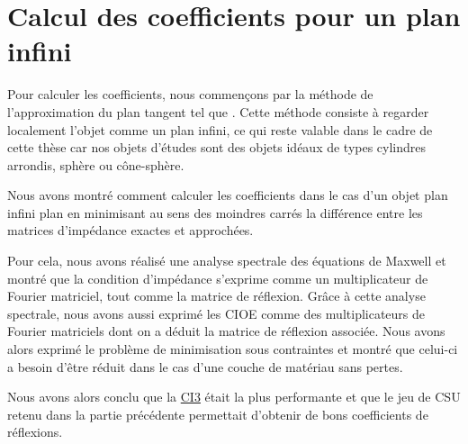 \chapter{Calcul des coefficients pour un plan infini}
\label{sec:plan}
\minitoc
\newpage
{}
Pour calculer les coefficients, nous commençons par la méthode de l'approximation du plan tangent tel que \cite{hoppe_impedance_1995}. Cette méthode consiste à regarder localement l'objet comme un plan infini, ce qui reste valable dans le cadre de cette thèse car nos objets d'études sont des objets idéaux de types cylindres arrondis, sphère ou cône-sphère.






Nous avons montré comment calculer les coefficients dans le cas d'un objet plan infini plan en minimisant au sens des moindres carrés la différence entre les matrices d'impédance exactes et approchées. 

Pour cela, nous avons réalisé une analyse spectrale des équations de Maxwell et montré que la condition d'impédance s'exprime comme un multiplicateur de Fourier matriciel, tout comme la matrice de réflexion. Grâce à cette analyse spectrale, nous avons aussi exprimé les CIOE comme des multiplicateurs de Fourier matriciels dont on a déduit la matrice de réflexion associée. Nous avons alors exprimé le problème de minimisation sous contraintes et montré que celui-ci a besoin d'être réduit dans le cas d'une couche de matériau sans pertes.

Nous avons alors conclu que la \hyperlink{ci3}{CI3} était la plus performante et que le jeu de CSU retenu dans la partie précédente permettait d'obtenir de bons coefficients de réflexions.
